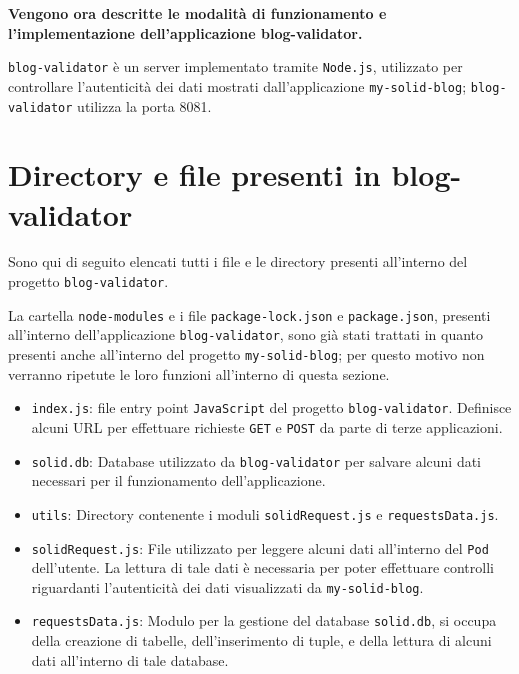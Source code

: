 \textbf{Vengono ora descritte le modalità di funzionamento e l'implementazione dell'applicazione blog-validator.}

\bigskip

{\tt blog-validator} è un server implementato tramite {\tt Node.js}, utilizzato per controllare l'autenticità dei dati mostrati dall'applicazione {\tt my-solid-blog}; {\tt blog-validator} utilizza la porta 8081.

\bigskip


\section{Directory e file presenti in blog-validator}

\medskip

Sono qui di seguito elencati tutti i file e le directory presenti all'interno del progetto {\tt blog-validator}.

\medskip

La cartella {\tt node-modules} e i file {\tt package-lock.json} e {\tt package.json}, presenti all'interno dell'applicazione {\tt blog-validator}, sono già stati trattati in quanto presenti anche all'interno del progetto {\tt my-solid-blog}; per questo motivo non verranno ripetute le loro funzioni all'interno di questa sezione.

\begin{itemize}
	\item {\tt index.js}: file entry point {\tt JavaScript} del progetto {\tt blog-validator}. Definisce alcuni URL per effettuare richieste {\tt GET} e {\tt POST} da parte di terze applicazioni.
	\item {\tt solid.db}: Database utilizzato da {\tt blog-validator} per salvare alcuni dati 
	necessari per il funzionamento dell'applicazione.
	\item {\tt utils}: Directory contenente i moduli {\tt solidRequest.js} e {\tt requestsData.js}.
	\item {\tt solidRequest.js}: File utilizzato per leggere alcuni dati all'interno del {\tt Pod} dell'utente. La lettura di tale dati è necessaria per poter effettuare controlli riguardanti l'autenticità dei dati visualizzati da {\tt my-solid-blog}.
	\item {\tt requestsData.js}: Modulo per la gestione del database {\tt solid.db}, si occupa della creazione di tabelle, dell'inserimento di tuple, e della lettura di alcuni dati all'interno di tale database.
\end{itemize}

